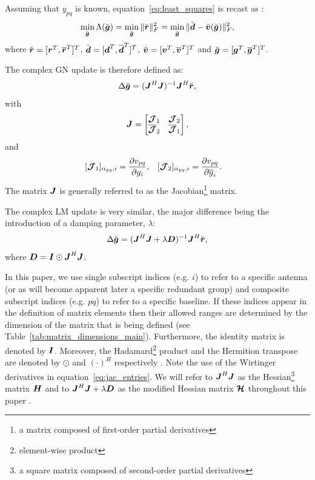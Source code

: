 \documentclass[useAMS,usenatbib]{mn2e}
\newcommand{\br}{\bmath{r}}
\newcommand{\bg}{\bmath{g}}
\newcommand{\bd}{\bmath{d}}
\newcommand{\bv}{\bmath{v}}
\newcommand{\bJ}{\bmath{J}}
\newcommand{\bD}{\bmath{D}}
\newcommand{\bH}{\bmath{H}}
\newcommand{\bI}{\bmath{I}}
\newcommand{\bmJ}{\bmath{\mathcal{J}}}
\newcommand{\bmH}{\bmath{\mathcal{H}}}
\newcommand{\conj}[1]{\overline{#1}}
\begin{document}
Assuming that $y_{pq}$ is known, equation~\ref{eq:least_squares} is recast as \citep{Smirnov2015}:
\begin{equation}
\label{eq:least_squares_augmented}
\min_{\breve{\bg}} \Lambda(\breve{\bg}) = \min_{\breve{\bg}} \|\breve{\br}\|_F^2 = \min_{\breve{\bg}} \|\breve{\bd} - \breve{\bv}(\breve{\bg})\|_F^2, 
\end{equation} 
where $\breve{\br} = [\br^T,\conj{\br}^T]^T$, $\breve{\bd} = [\bd^T,\conj{\bd}^T]^T$, $\breve{\bv} = [\bv^T,\conj{\bv}^T]^T$ and $\breve{\bg} = [\bg^T,\conj{\bg}^T]^T$.

The complex GN update is therefore defined as:
\begin{equation}
\label{eq:GN_update_skymodel}
 \Delta \breve{\bg} = (\bJ^H\bJ)^{-1}\bJ^H\breve{\br},
\end{equation}
with 
\begin{equation}
\label{eq:Jacobian_skymodel}
\bJ = \begin{bmatrix}
       \bmJ_1 & \bmJ_2\\
       \conj{\bmJ}_2 & \conj{\bmJ}_1 
      \end{bmatrix},
\end{equation}
and
\begin{align}
\label{eq:jac_entries}
[\bmJ_1]_{\alpha_{pq},i} &= \frac{\partial v_{pq}}{\partial g_i}, & [\bmJ_2]_{\alpha_{pq},i} &= \frac{\partial v_{pq}}{\partial \conj{g}_i}. 
\end{align}
The matrix $\bJ$ is generally referred to as the Jacobian\footnote{a matrix composed of first-order partial derivatives} matrix. 

The complex LM update is very similar, the major difference being the introduction of a damping parameter, $\lambda$:
\begin{equation}
\label{eq:LM_update_skymodel}
\Delta \breve{\bg} = (\bJ^H\bJ + \lambda\bD)^{-1}\bJ^H\breve{\br},
\end{equation}
where $\bD=\bI\odot\bJ^H\bJ$. 

In this paper, we use single subscript indices (e.g. $i$) to refer to a specific antenna (or as will become apparent later a specific redundant group) and composite subscript indices (e.g. $pq$) to refer to 
a specific baseline. If these indices appear in the definition of matrix elements then their allowed ranges are determined by the dimension of the matrix that 
is being defined (see Table~\ref{tab:matrix_dimensions_main}). Furthermore, the identity matrix is denoted by $\bI$. Moreover, the Hadamard\footnote{element-wise product} product and the Hermition transpose are denoted by $\odot$ and $(\cdot)^H$ respectively \citep{Liu2008}. Note the use of the Wirtinger derivatives in equation~\ref{eq:jac_entries}.
We will refer to $\bJ^H\bJ$ as the Hessian\footnote{a square matrix composed of second-order partial derivatives} matrix $\bH$ and to $\bJ^H\bJ + \lambda\bD$ as the modified Hessian matrix $\bmH$ throughout this paper \citep{Madsen:LM}. 
\end{document}
